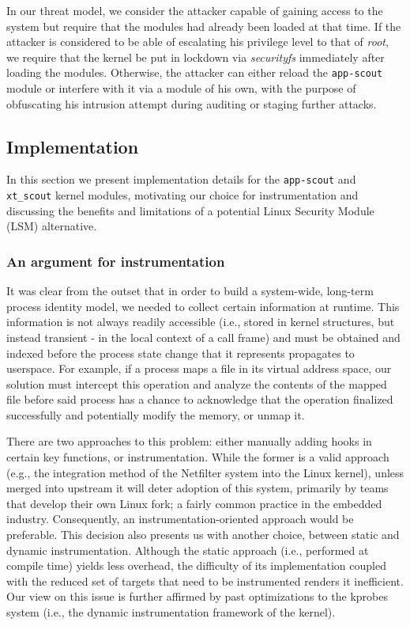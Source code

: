 In our threat model, we consider the attacker capable of gaining access to the
system but require that the \scout{} modules had already been loaded at that
time. If the attacker is considered to be able of escalating his privilege level
to that of \textit{root}, we require that the kernel be put in lockdown via
\textit{securityfs} immediately after loading the \scout{} modules. Otherwise,
the attacker can either reload the \texttt{app-scout} module or interfere with
it via a module of his own, with the purpose of obfuscating his intrusion
attempt during auditing or staging further attacks.

\subsection{Implementation}
\label{apffw:appscout:implementation}

In this section we present implementation details for the \texttt{app-scout} and
\texttt{xt\_scout} kernel modules, motivating our choice for instrumentation and
discussing the benefits and limitations of a potential Linux Security Module
(LSM) alternative.


\subsubsection{An argument for instrumentation}

It was clear from the outset that in order to build a system-wide, long-term
process identity model, we needed to collect certain information at runtime.
This information is not always readily accessible (i.e., stored in kernel
structures, but instead transient - in the local context of a call frame) and
must be obtained and indexed before the process state change that it represents
propagates to userspace. For example, if a process maps a file in its virtual
address space, our solution must intercept this operation and analyze the
contents of the mapped file before said process has a chance to acknowledge that
the operation finalized successfully and potentially modify the memory, or unmap
it.

There are two approaches to this problem: either manually adding hooks in
certain key functions, or instrumentation. While the former is a valid approach
(e.g., the integration method of the Netfilter system into the Linux kernel),
unless merged into upstream it will deter adoption of this system, primarily by
teams that develop their own Linux fork; a fairly common practice in the
embedded industry. Consequently, an instrumentation-oriented approach would be
preferable. This decision also presents us with another choice, between static
and dynamic instrumentation. Although the static approach (i.e., performed at
compile time) yields less overhead, the difficulty of its implementation coupled
with the reduced set of targets that need to be instrumented renders it
inefficient. Our view on this issue is further affirmed by past optimizations to
the kprobes system (i.e., the dynamic instrumentation framework of the kernel).

